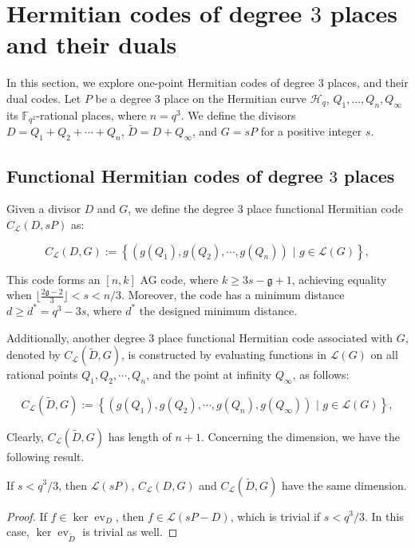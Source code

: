 \documentclass[entropy,article,submit,pdftex,moreauthors]{Definitions/mdpi}
\DeclareMathOperator{\ev}{ev}
\newcommand{\g}{\mathfrak{g}}
\begin{document}
\section{Hermitian codes of degree $3$ places and their duals \label{sec:Herm}}

In this section, we explore one-point Hermitian codes of degree $3$ places, and their dual codes. Let $P$ be a degree $3$ place on the Hermitian curve $\mathscr{H}_q$, $Q_1,\ldots,Q_n,Q_\infty$ its $\mathbb{F}_{q^2}$-rational places, where $n=q^3$. We define the divisors $D=Q_1+Q_2+\cdots+Q_n$, $\widetilde{D}=D+Q_{\infty}$, and $G=sP$ for a positive integer $s$.


\subsection{Functional Hermitian codes of degree $3$ places}
Given a divisor $D$ and $G$, we define the degree $3$ place functional Hermitian code $C_{\mathcal{L}}(D,sP)$ as:

\[C_{\mathcal{L}}(D,G):= \left\lbrace \left(g(Q_1),g(Q_2),\cdots,g(Q_n) \right)\,\, |\,\, g \in  \mathscr{L}(G) \right\rbrace, \]

This code forms an $[n,k]$ AG code, where $k\geq 3s-\g+1$, achieving equality when $\lfloor\frac{ 2 \g-2}{3}\rfloor <s<n/3$. Moreover, the code has a minimum distance $d\geq d^*=q^3-3s$, where $d^*$ the designed minimum distance.

Additionally, another degree $3$ place functional Hermitian code associated with $G$, denoted by $C_{\mathcal{L}}(\widetilde{D},G)$, is constructed by evaluating functions in $\mathscr{L}(G)$ on all rational points $Q_1,Q_2,\cdots,Q_n$, and the point at infinity $Q_{\infty}$, as follows:

\[C_{\mathcal{L}}(\widetilde{D},G):= \left\lbrace \left(g(Q_1),g(Q_2),\cdots,g(Q_n),g(Q_{\infty}) \right)\,\, |\,\, g \in  \mathscr{L}(G)\right\rbrace ,\]

Clearly, $C_{\mathcal{L}}(\widetilde{D},G)$ has length of $n+1$. Concerning the dimension, we have the following result.
\begin{Proposition}
If $s< q^3/3$, then $\mathscr{L}(sP)$, $C_{\mathcal{L}}(D,G)$ and $C_{\mathcal{L}}(\widetilde{D},G)$ have the same dimension. 
\end{Proposition}
\begin{proof}
If $f\in \ker \ev_D$, then $f\in \mathscr{L}(sP-D)$, which is trivial if $s<q^3/3$. In this case, $\ker \ev_{\widetilde{D}}$ is trivial as well. 
\end{proof}
\end{document}
